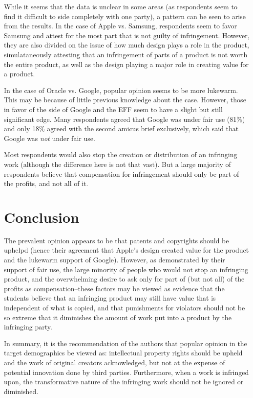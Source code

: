 \documentclass[prodmode,cs196]{acmlarge}
\begin{document}
While it seems that the data is unclear in some areas (as respondents seem to find it difficult to side completely with one party), a pattern can be seen to arise from the results. In the case of Apple vs. Samsung, respondents seem to favor Samsung and attest for the most part that is not guilty of infringement. However, they are also divided on the issue of how much design plays a role in the product, simulataneously attesting that an infringement of parts of a product is not worth the entire product, as well as the design playing a major role in creating value for a product.

In the case of Oracle vs. Google, popular opinion seems to be more lukewarm. This may be because of little previous knowledge about the case. However, those in favor of the side of Google and the EFF seem to have a slight but still significant edge. Many respondents agreed that Google was under fair use (81\%) and only 18\% agreed with the second amicus brief exclusively, which said that Google was \textit{not} under fair use.

Most respondents would also stop the creation or distribution of an infringing work (although the difference here is not that vast). But a large majority of respondents believe that compensation for infringement should only be part of the profits, and not all of it.

\section{Conclusion}

The prevalent opinion appears to be that patents and copyrights should be uphelpd (hence their agreement that Apple's design created value for the product and the lukewarm support of Google). However, as demonstrated by their support of fair use, the large minority of people who would not stop an infringing product, and the overwhelming desire to ask only for part of (but not all) of the profits as compensation--these factors may be viewed as evidence that the students believe that an infringing product may still have value that is independent of what is copied, and that punishments for violators should not be so extreme that it diminishes the amount of work put into a product by the infringing party.

In summary, it is the recommendation of the authors that popular opinion in the target demographics be viewed as: intellectual property rights should be upheld and the work of original creators acknowledged, but not at the expense of potential innovation done by third parties. Furthermore, when a work is infringed upon, the transformative nature of the infringing work should not be ignored or diminished.

\nocite{AppleiPhoneDesignPatent}

\label{sect:bib}

{}
\end{document}
